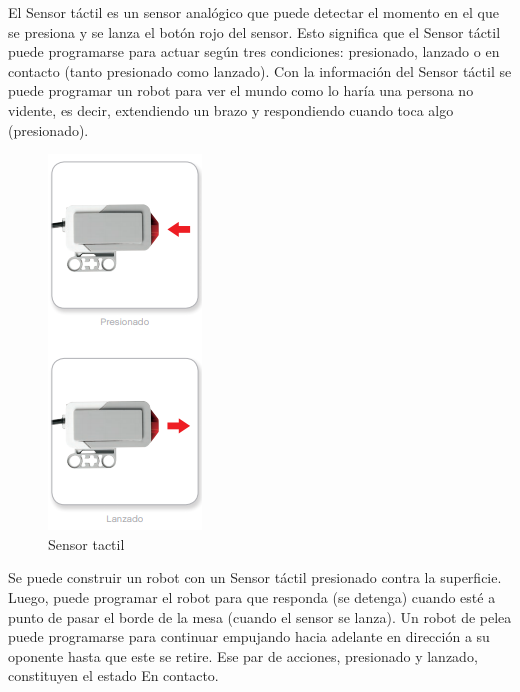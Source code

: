 El Sensor táctil es un sensor analógico que puede detectar el momento en el que se presiona y se lanza el botón rojo del sensor. Esto significa que el Sensor táctil puede programarse para actuar según tres condiciones: presionado, lanzado o en contacto (tanto presionado como lanzado). Con la información del Sensor táctil se puede programar un robot para ver el mundo como lo haría una persona no vidente, es decir, extendiendo un brazo y respondiendo cuando toca algo (presionado).
\begin{figure}
    \centering
    \includegraphics[width=0.5\linewidth]{img/tactil.png}
    \caption{Sensor tactil}
    \label{fig:tactil}
\end{figure}
Se puede construir un robot con un Sensor táctil presionado contra la superficie. Luego, puede programar el robot para que responda (se detenga) cuando esté a punto de pasar el borde de la mesa (cuando el sensor se lanza). Un robot de pelea puede programarse para continuar empujando hacia adelante en dirección a su oponente hasta que este se retire. Ese par de acciones, presionado y lanzado, constituyen el estado En contacto.

